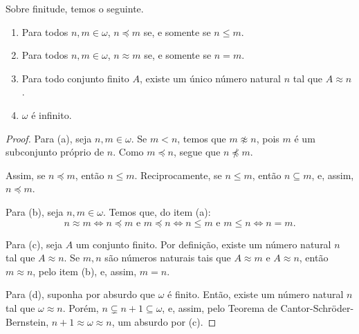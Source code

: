 \begin{corollary}[$Z^-$]Sobre finitude, temos o seguinte.\label{cor:finitoCardinal}
    \begin{enumerate}[label=(\alph*)]
        \item Para todos $n, m\in \omega$, $n\preceq m$ se, e somente se $n\leq m$.
        \item Para todos $n, m\in \omega$, $n\approx m$ se, e somente se $n=m$.
        \item Para todo conjunto finito $A$, existe um único número natural $n$ tal que $A\approx n$.
        \item $\omega$ é infinito.\label{item:omegaInfinito}
    \end{enumerate}
\end{corollary}
\begin{proof}
    Para (a), seja $n, m\in \omega$.
    Se $m<n$, temos que $m \not \approx n$, pois $m$ é um subconjunto próprio de $n$.
    Como $m\preceq n$, segue que $n\not\preceq m$.

    Assim, se $n\preceq m$, então $n\leq m$.
    Reciprocamente, se $n\leq m$, então $n\subseteq m$, e, assim, $n\preceq m$.

    Para (b), seja $n, m\in \omega$.
    Temos que, do item (a):
    \[
        n\approx m \Longleftrightarrow n\preceq m \text{ e } m\preceq n \Longleftrightarrow n\leq m \text{ e } m\leq n \Longleftrightarrow n=m.
    \]

    Para (c), seja $A$ um conjunto finito.
    Por definição, existe um número natural $n$ tal que $A\approx n$.
    Se $m, n$ são números naturais tais que $A\approx m$ e $A\approx n$, então $m\approx n$, pelo item (b), e, assim, $m=n$.

    Para (d), suponha por absurdo que $\omega$ é finito.
    Então, existe um número natural $n$ tal que $\omega\approx n$.
    Porém, $n\subsetneq n+1\subseteq \omega$, e, assim, pelo Teorema de Cantor-Schröder-Bernstein, $n+1\approx \omega\approx n$, um absurdo por (c). 
\end{proof}

